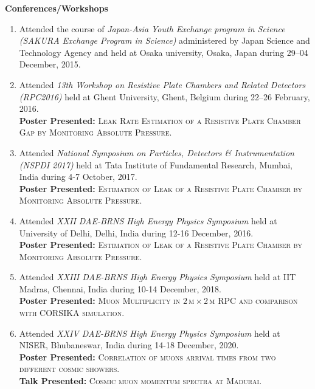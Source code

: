 \documentclass[12pt]{article}
\begin{document}
\colorbox{gray!40}{\begin{minipage}{17.5cm}
\bf {Conferences/Workshops} 
\end{minipage} }
\begin{minipage}{1.05\textwidth}
 \vspace{0.4cm}
\begin{enumerate}
  
\item Attended the course of \emph{Japan-Asia Youth Exchange program in Science (SAKURA Exchange Program in Science)} administered by Japan Science and Technology Agency and held at Osaka university, Osaka, Japan during 29--04 December, 2015. 
  
\item Attended \emph{13th Workshop on Resistive Plate Chambers and
  Related Detectors (RPC2016)} held at Ghent University, Ghent,
  Belgium during 22--26 February, 2016.\\
  {\bf{Poster Presented:}} \textsc{Leak Rate Estimation of a Resistive Plate Chamber Gap by Monitoring Absolute Pressure}.

\item Attended \emph{National Symposium on Particles, Detectors \& Instrumentation (NSPDI 2017)} held at Tata Institute of Fundamental Research, Mumbai,  India during 4-7 October, 2017. \\
  {\bf{Poster Presented:}} \textsc{Estimation of Leak of a Resistive Plate Chamber by Monitoring Absolute Pressure}.

  \item Attended \emph{XXII DAE-BRNS High Energy Physics Symposium}  held at University of Delhi, Delhi, India during 12-16 December, 2016. \\
  {\bf{Poster Presented:}} \textsc{Estimation of Leak of a Resistive Plate Chamber by Monitoring Absolute Pressure}.

\item Attended \emph{XXIII DAE-BRNS High Energy Physics Symposium}  held at IIT Madras, Chennai, India during 10-14 December, 2018. \\
  {\bf{Poster Presented:}} \textsc{Muon Multiplicity in $2$\,m\,$\times$\,2\,m RPC and comparison with CORSIKA simulation}.

\item Attended \emph{XXIV DAE-BRNS High Energy Physics Symposium}  held at NISER, Bhubaneswar, India during 14-18 December, 2020. \\
  {\bf{Poster Presented:}} \textsc{Correlation of muons arrival times from two different cosmic showers}.\\
  {\bf{Talk Presented:}} \textsc{Cosmic muon momentum spectra at Madurai}.
  
  

\end{enumerate}
\end{minipage}
\end{document}

